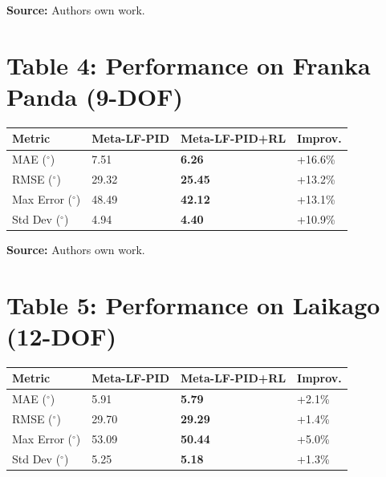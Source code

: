 \documentclass[11pt,a4paper]{article}
\begin{document}
\vspace{0.2cm}
\noindent
\textbf{Source:} Authors own work.


\section*{Table 4: Performance on Franka Panda (9-DOF)}

\begin{tabular}{@{\extracolsep{\fill}}llll}
\hline
\textbf{Metric} & \textbf{Meta-LF-PID} & \textbf{Meta-LF-PID+RL} & \textbf{Improv.} \\
\hline
MAE ($^\circ$) & 7.51 & \textbf{6.26} & +16.6\% \\
RMSE ($^\circ$) & 29.32 & \textbf{25.45} & +13.2\% \\
Max Error ($^\circ$) & 48.49 & \textbf{42.12} & +13.1\% \\
Std Dev ($^\circ$) & 4.94 & \textbf{4.40} & +10.9\% \\
\hline
\end{tabular}

\vspace{0.2cm}
\noindent
\textbf{Source:} Authors own work.


\section*{Table 5: Performance on Laikago (12-DOF)}

\begin{tabular}{@{\extracolsep{\fill}}llll}
\hline
\textbf{Metric} & \textbf{Meta-LF-PID} & \textbf{Meta-LF-PID+RL} & \textbf{Improv.} \\
\hline
MAE ($^\circ$) & 5.91 & \textbf{5.79} & +2.1\% \\
RMSE ($^\circ$) & 29.70 & \textbf{29.29} & +1.4\% \\
Max Error ($^\circ$) & 53.09 & \textbf{50.44} & +5.0\% \\
Std Dev ($^\circ$) & 5.25 & \textbf{5.18} & +1.3\% \\
\hline
\end{tabular}
\end{document}
